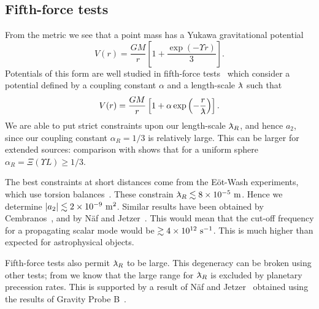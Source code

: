 \subsection{Fifth-force tests\label{sec:Fifth}}

From the metric  we see that a point mass has a Yukawa gravitational potential~\cite{Stelle1978, Capozziello2009a, Naf2010}
\begin{equation}
V(r) = \frac{GM}{r}\left[1 + \frac{\exp(- \Upsilon r)}{3}\right].
\end{equation}
Potentials of this form are well studied in fifth-force tests~\cite{Will2006, Adelberger2009, Adelberger2003} which consider a potential defined by a coupling constant $\alpha$ and a length-scale $\lambdabar$ such that
\begin{equation}
V(r) = \frac{GM}{r}\left[1 + \alpha\exp\left(-\frac{r}{\lambdabar}\right)\right].
\end{equation}
We are able to put strict constraints upon our length-scale $\lambdabar_R$, and hence $a_2$, since our coupling constant $\alpha_R = 1/3$ is relatively large. This can be larger for extended sources: comparison with  shows that for a uniform sphere $\alpha_R = \Xi(\Upsilon L) \geq 1/3$.

The best constraints at short distances come from the E\"{o}t-Wash experiments, which use torsion balances~\cite{Kapner2007a, Hoyle2004}. These constrain $\lambdabar_R \lesssim 8\times 10^{-5}\units{m}$. Hence we determine $|a_2| \lesssim 2 \times 10^{-9}~\mathrm{m^2}$. Similar results have been obtained by Cembranos~\cite{Cembranos2009}, and by N\"{a}f and Jetzer~\cite{Naf2010}. This would mean that the cut-off frequency for a propagating scalar mode would be $\gtrsim 4 \times 10^{12}~\mathrm{s^{-1}}$. This is much higher than expected for astrophysical objects.

Fifth-force tests also permit $\lambdabar_R$ to be large. This degeneracy can be broken using other tests; from  we know that the large range for $\lambdabar_R$ is excluded by planetary precession rates. This is supported by a result of N\"{a}f and Jetzer~\cite{Naf2010} obtained using the results of Gravity Probe B~\cite{Everitt2009}.

